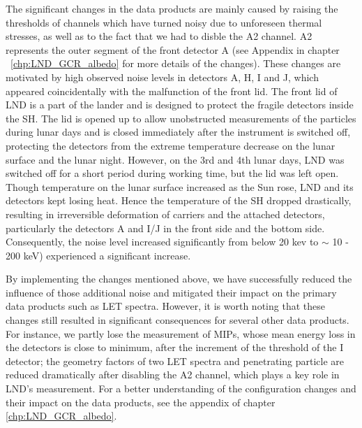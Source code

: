 The significant changes in the data products are mainly caused by raising the thresholds of channels which have turned noisy due to unforeseen thermal stresses, as well as to the fact that we had to disble the A2 channel. A2 represents the outer segment of the front detector A (see Appendix in chapter ~\ref{chp:LND_GCR_albedo} for more details of the changes). These changes are motivated by high observed noise levels in detectors A, H, I and J, which appeared coincidentally with the malfunction of the front lid. The front lid of \ac{LND} is a part of the lander and is designed to protect the fragile detectors inside the \ac{SH}. The lid is opened up to allow unobstructed measurements of the particles during lunar days and is closed immediately after the instrument is switched off, protecting the detectors from the extreme temperature decrease on the lunar surface and the lunar night. However, on the 3rd and 4th lunar days, \ac{LND} was switched off for a short period during working time, but the lid was left open. Though temperature on the lunar surface increased as the Sun rose, \ac{LND} and its detectors kept losing heat. Hence the temperature of the \ac{SH} dropped drastically, resulting in irreversible deformation of carriers and the attached detectors, particularly the detectors A and I/J in the front side and the bottom side. Consequently, the noise level increased significantly from below 20 kev to $\sim$ 10 - 200 keV) experienced a significant increase.

By implementing the changes mentioned above, we have successfully reduced the influence of those additional noise and mitigated their impact on the primary data products such as \ac{LET} spectra. However, it is worth noting that these changes still resulted in significant consequences for several other data products. For instance, we partly lose the measurement of \acp{MIP}, whose mean energy loss in the detectors is close to minimum, after the increment of the threshold of the I detector; the geometry factors of two \ac{LET} spectra and penetrating particle are reduced dramatically after disabling the A2 channel, which plays a key role in \ac{LND}'s measurement. For a better understanding of the configuration changes and their impact on the data products, see the appendix of chapter \ref{chp:LND_GCR_albedo}.

